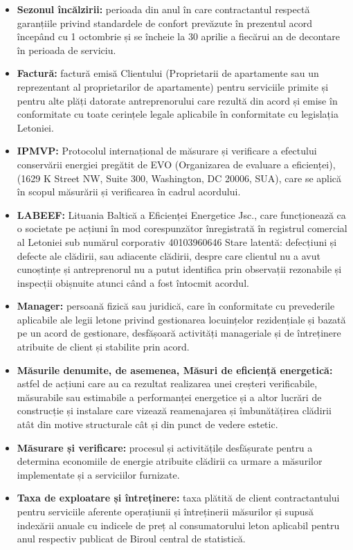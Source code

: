 \begin{multicols}{2}
\begin{itemize}[label={}]
\item\textbf{Sezonul încălzirii:} perioada din anul în care contractantul respectă garanțiile privind standardele de confort prevăzute în prezentul acord începând cu 1 octombrie și se încheie la 30 aprilie a fiecărui an de decontare în perioada de serviciu.
\item\textbf{Factură:} factură emisă Clientului (Proprietarii de apartamente sau un reprezentant al proprietarilor de apartamente) pentru serviciile primite și pentru alte plăți datorate antreprenorului care rezultă din acord și emise în conformitate cu toate cerințele legale aplicabile în conformitate cu legislația Letoniei.
\item\textbf{IPMVP:} Protocolul internațional de măsurare și verificare a efectului conservării energiei pregătit de EVO (Organizarea de evaluare a eficienței), (1629 K Street NW, Suite 300, Washington, DC 20006, SUA), care se aplică în scopul măsurării și verificarea în cadrul acordului.
\item\textbf{LABEEF:} Lituania Baltică a Eficienței Energetice Jsc., care funcționează ca o societate pe acțiuni în mod corespunzător înregistrată în registrul comercial al Letoniei sub numărul corporativ 40103960646
Stare latentă: defecțiuni și defecte ale clădirii, sau adiacente clădirii, despre care clientul nu a avut cunoștințe și antreprenorul nu a putut identifica prin observații rezonabile și inspecții obișnuite atunci când a fost întocmit acordul.
\item\textbf{Manager:} persoană fizică sau juridică, care în conformitate cu prevederile aplicabile ale legii letone privind gestionarea locuințelor rezidențiale și bazată pe un acord de gestionare, desfășoară activități manageriale și de întreținere atribuite de client și stabilite prin acord.
\item\textbf{Măsurile  denumite, de asemenea, Măsuri de eficiență energetică:} astfel de acțiuni care au ca rezultat realizarea unei creșteri verificabile, măsurabile sau estimabile a performanței energetice și a altor lucrări de construcție și instalare care vizează reamenajarea și îmbunătățirea clădirii atât din motive structurale cât și din punct de vedere estetic.
\item\textbf{Măsurare și verificare:} procesul și activitățile desfășurate pentru a determina economiile de energie atribuite clădirii ca urmare a măsurilor implementate și a serviciilor furnizate.
\item\textbf{Taxa de exploatare și întreținere:} taxa plătită de client contractantului pentru serviciile aferente operațiunii și întreținerii măsurilor și supusă indexării anuale cu indicele de preț al consumatorului leton aplicabil pentru anul respectiv publicat de Biroul central de statistică.

\end{itemize}
\end{multicols}
